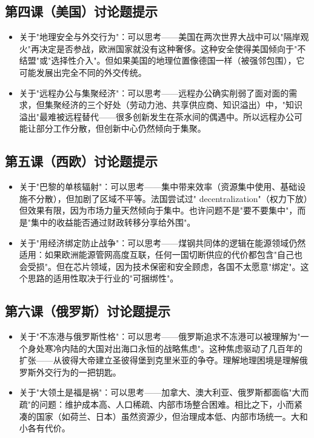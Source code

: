 \documentclass[a4paper,12pt]{ctexart}
\begin{document}
\subsection*{第四课（美国）讨论题提示}
\begin{itemize}
  \item 关于"地理安全与外交行为"：可以思考——美国在两次世界大战中可以"隔岸观火"再决定是否参战，欧洲国家就没有这种奢侈。这种安全使得美国倾向于"不结盟"或"选择性介入"。但如果美国的地理位置像德国一样（被强邻包围），它可能发展出完全不同的外交传统。
  \item 关于"远程办公与集聚经济"：可以思考——远程办公确实削弱了面对面的需求，但集聚经济的三个好处（劳动力池、共享供应商、知识溢出）中，"知识溢出"最难被远程替代——很多创新发生在茶水间的偶遇中。所以远程办公可能让部分工作分散，但创新中心仍然倾向于集聚。
\end{itemize}

\subsection*{第五课（西欧）讨论题提示}
\begin{itemize}
  \item 关于"巴黎的单核辐射"：可以思考——集中带来效率（资源集中使用、基础设施不分散），但加剧了区域不平等。法国尝试过" decentralization"（权力下放）但效果有限，因为市场力量天然倾向于集中。也许问题不是"要不要集中"，而是"集中的收益能否通过财政转移分享给外围"。
  \item 关于"用经济绑定防止战争"：可以思考——煤钢共同体的逻辑在能源领域仍然适用：如果欧洲能源管网高度互联，任何一国切断供应的代价都包含"自己也会受损"。但在芯片领域，因为技术保密和安全顾虑，各国不太愿意"绑定"。这个思路的适用性取决于行业的"可捆绑性"。
\end{itemize}

\subsection*{第六课（俄罗斯）讨论题提示}
\begin{itemize}
  \item 关于"不冻港与俄罗斯性格"：可以思考——俄罗斯追求不冻港可以被理解为"一个身处寒冷内陆的大国对出海口永恒的战略焦虑"。这种焦虑驱动了几百年的扩张——从彼得大帝建立圣彼得堡到克里米亚的争夺。理解地理困境是理解俄罗斯外交行为的一把钥匙。
  \item 关于"大领土是福是祸"：可以思考——加拿大、澳大利亚、俄罗斯都面临"大而疏"的问题：维护成本高、人口稀疏、内部市场整合困难。相比之下，小而紧凑的国家（如荷兰、日本）虽然资源少，但治理成本低、内部市场统一。大和小各有代价。
\end{itemize}
\end{document}
